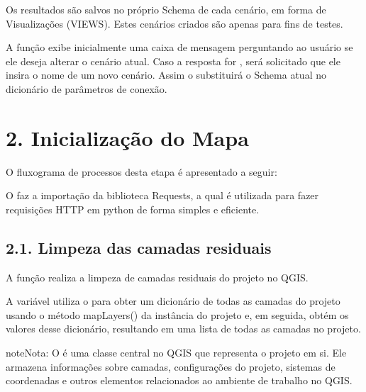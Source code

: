 \documentclass[a4paper,10pt,brazil]{sphinxmanual}
\begin{document}
\sphinxAtStartPar
Os resultados são salvos no próprio Schema de cada cenário, em forma de Visualizações (VIEWS). Estes cenários criados são apenas para fins de testes.

\sphinxAtStartPar
A função  exibe inicialmente uma caixa de mensagem perguntando ao usuário se ele deseja alterar o cenário atual. Caso a resposta for , será solicitado que ele insira o nome de um novo cenário. Assim o  substituirá o Schema atual no dicionário de parâmetros de conexão.

\sphinxstepscope


\section{2. Inicialização do Mapa}
\label{\detokenize{2inicializacaoMapa:inicializacao-do-mapa}}\label{\detokenize{2inicializacaoMapa::doc}}
\sphinxAtStartPar
O fluxograma de processos desta etapa é apresentado a seguir:


\sphinxAtStartPar
O  faz a importação da biblioteca Requests, a qual é utilizada para fazer requisições HTTP em python de forma simples e eficiente.


\subsection{2.1. Limpeza das camadas residuais}
\label{\detokenize{2inicializacaoMapa:limpeza-das-camadas-residuais}}
\sphinxAtStartPar
A função  realiza a limpeza de camadas residuais do projeto no QGIS.

\sphinxAtStartPar
A variável  utiliza o  para obter um dicionário de todas as camadas do projeto usando o método mapLayers() da instância do projeto e, em seguida, obtém os valores desse dicionário, resultando em uma lista de todas as camadas no projeto.

\begin{sphinxadmonition}{note}{Nota:}
\sphinxAtStartPar
O  é uma classe central no QGIS que representa o projeto em si. Ele armazena informações sobre camadas, configurações do projeto, sistemas de coordenadas e outros elementos relacionados ao ambiente de trabalho no QGIS.
\end{sphinxadmonition}
\end{document}
